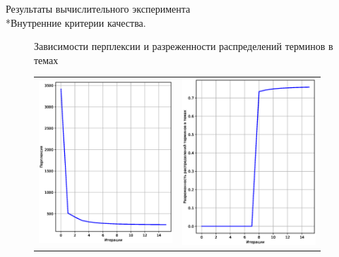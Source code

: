 \documentclass{beamer}
\begin{document}
\begin{frame}{Результаты вычислительного эксперимента \\*Внутренние критерии качества.}
\vspace{0.01em}
\begin{figure}
      \vspace{0.01em}
        Зависимости перплексии и разреженности распределений терминов в темах \begin{tabular}{cc}
        \includegraphics[width=5cm]{perplexity}
         &
         \includegraphics[width=5cm]{sparseTheta}
         \end{tabular}
\label{fg:Example}
\end{figure}
\end{frame}
\end{document}
